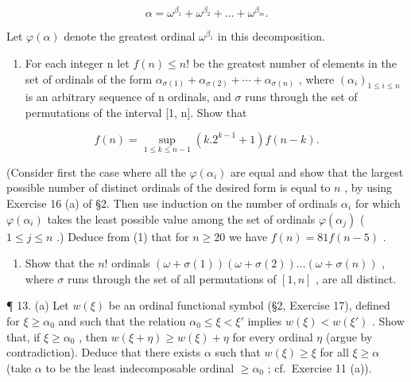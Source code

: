 \[
\alpha = \omega^ {\beta_ {1}} + \omega^ {\beta_ {2}} + \dots + \omega^ {\beta_ {m}}.
\]

Let \(\varphi(\alpha)\) denote the greatest ordinal \(\omega^{\beta_1}\) in this decomposition.

\begin{enumerate}
\def\labelenumi{(\alph{enumi})}
\setcounter{enumi}{1}
\tightlist
\item
  For each integer n let \(f(n) \leqslant n!\) be the greatest number of elements in the set of ordinals of the form \(\alpha_{\sigma(1)} + \alpha_{\sigma(2)} + \cdots + \alpha_{\sigma(n)}\) , where \((\alpha_i)_{1 \leqslant i \leqslant n}\) is an arbitrary sequence of n ordinals, and \(\sigma\) runs through the set of permutations of the interval {[}1, n{]}. Show that
\end{enumerate}

\[
f (n) = \sup _ {1 \leqslant k \leqslant n - 1} (k. 2 ^ {k - 1} + 1) f (n - k).\tag{1}
\]

(Consider first the case where all the \(\varphi(\alpha_i)\) are equal and show that the largest possible number of distinct ordinals of the desired form is equal to \(n\) , by using Exercise 16 (a) of §2. Then use induction on the number of ordinals \(\alpha_i\) for which \(\varphi(\alpha_i)\) takes the least possible value among the set of ordinals \(\varphi(\alpha_j)\) ( \(1 \leqslant j \leqslant n\) .) Deduce from (1) that for \(n \geqslant 20\) we have \(f(n) = 81f(n - 5)\) .

\begin{enumerate}
\def\labelenumi{(\alph{enumi})}
\setcounter{enumi}{2}
\tightlist
\item
  Show that the \(n!\) ordinals \((\omega + \sigma(1)) (\omega + \sigma(2)) \ldots (\omega + \sigma(n))\) , where \(\sigma\) runs through the set of all permutations of \([1, n]\) , are all distinct.
\end{enumerate}

¶ 13. (a) Let \(w(\xi)\) be an ordinal functional symbol (§2, Exercise 17), defined for \(\xi \geqslant \alpha_0\) and such that the relation \(\alpha_0 \leqslant \xi < \xi'\) implies \(w(\xi) < w(\xi')\) . Show that, if \(\xi \geqslant \alpha_0\) , then \(w(\xi + \eta) \geqslant w(\xi) + \eta\) for every ordinal \(\eta\) (argue by contradiction). Deduce that there exists \(\alpha\) such that \(w(\xi) \geqslant \xi\) for all \(\xi \geqslant \alpha\) (take \(\alpha\) to be the least indecomposable ordinal \(\geqslant \alpha_0\) ; cf.~Exercise 11 (a)).


